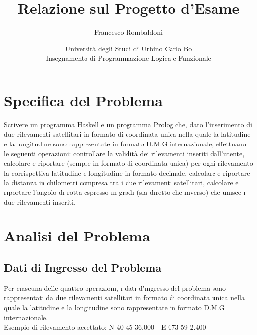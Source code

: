 \documentclass{article}
\title{\textbf{Relazione sul Progetto d'Esame}}
\author{Francesco Rombaldoni}
\date{\small Università degli Studi di Urbino Carlo Bo\\
	Insegnamento di Programmazione Logica e Funzionale}
\begin{document}
	\maketitle
	
	
\newpage

\section{Specifica del Problema}
Scrivere un programma Haskell e un programma Prolog che, dato l'inserimento di due rilevamenti satellitari in formato di coordinata unica nella quale la latitudine e la longitudine sono rappresentate in formato D.M.G internazionale, effettuano le seguenti operazioni: controllare la validità dei rilevamenti inseriti dall'utente, calcolare e riportare (sempre in formato di coordinata unica) per ogni rilevamento la corrispettiva latitudine e longitudine in formato decimale, calcolare e riportare la distanza in chilometri compresa tra i due rilevamenti satellitari, calcolare e riportare l'angolo di rotta espresso in gradi (sia diretto che inverso) che unisce i due rilevamenti inseriti.
\newline
\newline
\newpage
			
\section{Analisi del Problema}
\subsection{Dati di Ingresso del Problema}
Per ciascuna delle quattro operazioni, i dati d'ingresso del problema sono rappresentati da due rilevamenti satellitari in formato di coordinata unica nella quale la latitudine e la longitudine sono rappresentate in formato D.M.G internazionale. \\
Esempio di rilevamento accettato: N 40 45 36.000 - E 073 59 2.400
\end{document}
